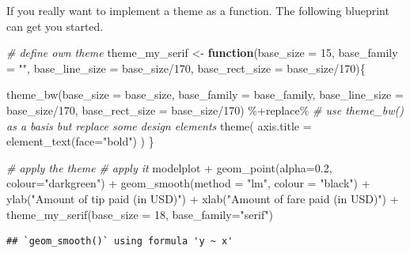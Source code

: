 \documentclass[
  12pt,
]{style/krantz}
\newenvironment{Shaded}{\begin{snugshade}}{\end{snugshade}}
\newcommand{\AttributeTok}[1]{\textcolor[rgb]{0.77,0.63,0.00}{#1}}
\newcommand{\CommentTok}[1]{\textcolor[rgb]{0.56,0.35,0.01}{\textit{#1}}}
\newcommand{\ControlFlowTok}[1]{\textcolor[rgb]{0.13,0.29,0.53}{\textbf{#1}}}
\newcommand{\DecValTok}[1]{\textcolor[rgb]{0.00,0.00,0.81}{#1}}
\newcommand{\FloatTok}[1]{\textcolor[rgb]{0.00,0.00,0.81}{#1}}
\newcommand{\FunctionTok}[1]{\textcolor[rgb]{0.00,0.00,0.00}{#1}}
\newcommand{\NormalTok}[1]{#1}
\newcommand{\OtherTok}[1]{\textcolor[rgb]{0.56,0.35,0.01}{#1}}
\newcommand{\SpecialCharTok}[1]{\textcolor[rgb]{0.00,0.00,0.00}{#1}}
\newcommand{\StringTok}[1]{\textcolor[rgb]{0.31,0.60,0.02}{#1}}
\begin{document}
If you really want to implement a theme as a function. The following blueprint can get you started.

\begin{Shaded}
\begin{Highlighting}[]
\CommentTok{\# define own theme}
\NormalTok{theme\_my\_serif }\OtherTok{\textless{}{-}} 
  \ControlFlowTok{function}\NormalTok{(}\AttributeTok{base\_size =} \DecValTok{15}\NormalTok{,}
           \AttributeTok{base\_family =} \StringTok{""}\NormalTok{,}
           \AttributeTok{base\_line\_size =}\NormalTok{ base\_size}\SpecialCharTok{/}\DecValTok{170}\NormalTok{,}
           \AttributeTok{base\_rect\_size =}\NormalTok{ base\_size}\SpecialCharTok{/}\DecValTok{170}\NormalTok{)\{ }
    
    \FunctionTok{theme\_bw}\NormalTok{(}\AttributeTok{base\_size =}\NormalTok{ base\_size,}
             \AttributeTok{base\_family =}\NormalTok{ base\_family,}
             \AttributeTok{base\_line\_size =}\NormalTok{ base\_size}\SpecialCharTok{/}\DecValTok{170}\NormalTok{,}
             \AttributeTok{base\_rect\_size =}\NormalTok{ base\_size}\SpecialCharTok{/}\DecValTok{170}\NormalTok{) }\SpecialCharTok{\%+replace\%}    \CommentTok{\# use theme\_bw() as a basis but replace some design elements}
    \FunctionTok{theme}\NormalTok{(}
      \AttributeTok{axis.title =} \FunctionTok{element\_text}\NormalTok{(}\AttributeTok{face=}\StringTok{"bold"}\NormalTok{)}
\NormalTok{    )}
\NormalTok{  \}}

\CommentTok{\# apply the theme}
\CommentTok{\# apply it }
\NormalTok{modelplot }\SpecialCharTok{+}
     \FunctionTok{geom\_point}\NormalTok{(}\AttributeTok{alpha=}\FloatTok{0.2}\NormalTok{, }\AttributeTok{colour=}\StringTok{"darkgreen"}\NormalTok{) }\SpecialCharTok{+}
     \FunctionTok{geom\_smooth}\NormalTok{(}\AttributeTok{method =} \StringTok{"lm"}\NormalTok{, }\AttributeTok{colour =} \StringTok{"black"}\NormalTok{) }\SpecialCharTok{+}
     \FunctionTok{ylab}\NormalTok{(}\StringTok{"Amount of tip paid (in USD)"}\NormalTok{) }\SpecialCharTok{+}
     \FunctionTok{xlab}\NormalTok{(}\StringTok{"Amount of fare paid (in USD)"}\NormalTok{) }\SpecialCharTok{+}
  \FunctionTok{theme\_my\_serif}\NormalTok{(}\AttributeTok{base\_size =} \DecValTok{18}\NormalTok{, }\AttributeTok{base\_family=}\StringTok{"serif"}\NormalTok{)}
\end{Highlighting}
\end{Shaded}

\begin{verbatim}
## `geom_smooth()` using formula 'y ~ x'
\end{verbatim}
\end{document}
